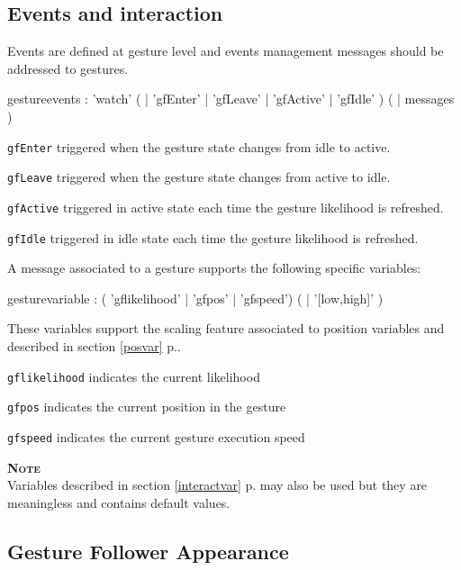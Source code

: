 \documentclass[a4paper,twoside]{report}
\newcommand{\subsublevel}[1]	{\subsection{#1}}
\newcommand{\fullref}[1]	{\ref{#1} p.\pageref{#1}}
\newcommand{\OSC}[1]		{\texttt{#1}}
\newcommand{\note}	[1]		{\vspace{2mm}\textbf{\hspace{-1.03cm}\textbf{\textsc{Note #1}}}}
\let\olditemize\itemize
\let\oldenditemize\enditemize
\renewenvironment{itemize} 	{\olditemize \setlength{\itemsep}{1mm}}{\oldenditemize}
\begin{document}
\subsublevel{Events and interaction}\label{gfevents}

Events are defined at gesture level and events management messages should be addressed to gestures. 

\begin{rail}
gestureevents :
		  	'watch' ( | 'gfEnter' | 'gfLeave' | 'gfActive' | 'gfIdle' )  (  |  messages )
\end{rail}

\begin{itemize}
\item \OSC{gfEnter} triggered when the gesture state changes from idle to active.
\item \OSC{gfLeave} triggered when the gesture state changes from active to idle.
\item \OSC{gfActive} triggered in active state each time the gesture likelihood is refreshed.
\item \OSC{gfIdle} triggered in idle state each time the gesture likelihood is refreshed.
\end{itemize}

A message associated to a gesture supports the following specific variables:
\begin{rail}
gesturevariable : 
		( 'gflikelihood'
		| 'gfpos'
		| 'gfspeed') ( | '[low,high]' ) 
\end{rail}
These variables support the scaling feature associated to position variables and described in section \fullref{posvar}.
\begin{itemize}
\item \OSC{gflikelihood} indicates the current likelihood 
\item \OSC{gfpos} indicates the current position in the gesture 
\item \OSC{gfspeed} indicates the current gesture execution speed 
\end{itemize}

\note{}\\
Variables described in section \fullref{interactvar} may also be used but they are meaningless and contains default values.


\subsublevel{Gesture Follower Appearance}\label{gfgraphs}
\end{document}
